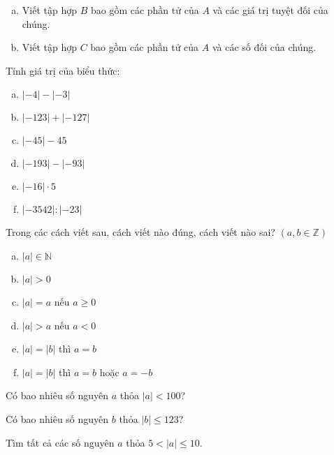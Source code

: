 \begin{bt}
\begin{enumerate}[a)]
\item Viết tập hợp $B$ bao gồm các phần tử của $A$ và các giá trị tuyệt đối của chúng.
\item Viết tập hợp $C$ bao gồm các phần tử của $A$ và các số đối của chúng.
\end{enumerate}
\end{bt}   \begin{bt}
Tính giá trị của biểu thức:
\begin{multicols}{2}
\begin{enumerate}[a)]
\item  $\left| { - 4} \right| - \left| { - 3} \right|$
\item $\left| { - 123} \right| + \left| { - 127} \right|$
\item $\left| { - 45} \right| - 45$
\item $\left| { - 193} \right| - \left| { - 93} \right|$
\item $\left| { - 16} \right| \cdot 5$
\item $\left| { - 3542} \right|:\left| { - 23} \right|$
\end{enumerate}
\end{multicols}
\end{bt}   \begin{bt}
Trong các cách viết sau, cách viết nào đúng, cách viết nào sai?  $\left( {a,b \in \mathbb{Z}} \right)$
\begin{enumerate}[a)]
\item  $\left| {a} \right| \in \mathbb{N}$
\item $\left| {a} \right| > 0$
\item $\left| {a} \right| = a$ nếu $a \ge 0$
\item $\left| {a} \right| > a$ nếu $a < 0$
\item $\left| {a} \right| = \left| {b} \right|$ thì $a = b$
\item $\left| {a} \right| = \left| {b} \right|$ thì $a = b$ hoặc $a = -b$
\end{enumerate}
\end{bt}   \begin{bt}
Có bao nhiêu số nguyên $a$ thỏa $\left| {a} \right| < 100$?
\end{bt}   \begin{bt}
Có bao nhiêu số nguyên $b$ thỏa $\left| {b} \right| \le 123$?
\end{bt}   \begin{bt}
Tìm tất cả các số nguyên $a$ thỏa $5 < \left| a \right| \le 10$.
\end{bt}